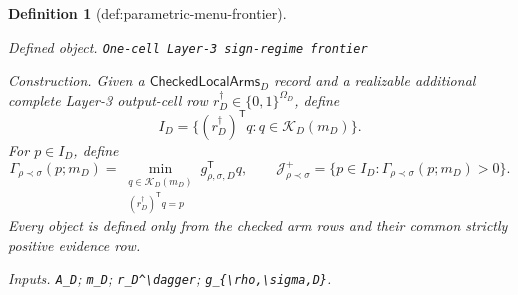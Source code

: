 \documentclass{article}
\newtheorem{definition}{Definition}
\begin{document}
\begin{definition}[def:parametric-menu-frontier]\label{def:parametric-menu-frontier}
\par\smallskip\noindent\emph{Defined object.} \texttt{One-\allowbreak{}cell Layer-\allowbreak{}3 sign-\allowbreak{}regime frontier}
\par\smallskip\noindent\emph{Construction.} Given a \(\mathsf{CheckedLocalArms}_D\) record and a realizable additional complete Layer-3 output-cell row \(r_D^\dagger\in\{0,1\}^{\Omega_D}\), define
\[
I_D=\{(r_D^\dagger)^{\mathsf T}q:q\in\mathcal K_D(m_D)\}.
\]
For \(p\in I_D\), define
\[
\Gamma_{\rho\prec\sigma}(p;m_D)
=\min_{\substack{q\in\mathcal K_D(m_D)\\
(r_D^\dagger)^{\mathsf T}q=p}}
g_{\rho,\sigma,D}^{\mathsf T}q,
\qquad
\mathcal J_{\rho\prec\sigma}^+
=\{p\in I_D:\Gamma_{\rho\prec\sigma}(p;m_D)>0\}.
\]
Every object is defined only from the checked arm rows and their common strictly positive evidence row.
\par\smallskip\noindent\emph{Inputs.} \texttt{A\_\allowbreak{}D}; \texttt{m\_\allowbreak{}D}; \texttt{r\_\allowbreak{}D\textasciicircum{}\textbackslash{}\allowbreak{}dagger}; \texttt{g\_\allowbreak{}\{\textbackslash{}\allowbreak{}rho,\allowbreak{}\textbackslash{}\allowbreak{}sigma,\allowbreak{}D\}\allowbreak{}}.
\end{definition}
\end{document}
